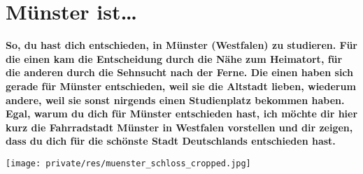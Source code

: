 \section{Münster ist\dots}
\textbf{So, du hast dich entschieden, in Münster (Westfalen) zu studieren.
	Für die einen kam die Entscheidung durch die Nähe zum Heimatort, für die anderen durch die Sehnsucht nach der Ferne.
	Die einen haben sich gerade für Münster entschieden, weil sie die Altstadt lieben, wiederum andere, weil sie sonst nirgends einen Studienplatz bekommen haben. 
	Egal, warum du dich für Münster entschieden hast, ich möchte dir hier kurz die Fahrradstadt Münster in Westfalen vorstellen und dir zeigen, dass du dich für die schönste Stadt Deutschlands entschieden hast.}

\begin{center}
	\texttt{[image: private/res/muenster\_schloss\_cropped.jpg]}
\end{center}

